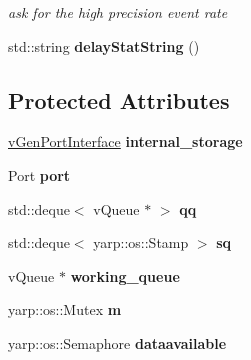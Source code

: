 \begin{DoxyCompactItemize}
\begin{DoxyCompactList}\small\item\em ask for the high precision event rate \end{DoxyCompactList}\item 
std\+::string {\bfseries delay\+Stat\+String} ()\hypertarget{classev_1_1vGenReadPort_a1e5ad389db86c5d6c5807f23ffbd6d7b}{}\label{classev_1_1vGenReadPort_a1e5ad389db86c5d6c5807f23ffbd6d7b}

\end{DoxyCompactItemize}
\subsection*{Protected Attributes}
\begin{DoxyCompactItemize}
\item 
\hyperlink{classev_1_1vGenPortInterface}{v\+Gen\+Port\+Interface} {\bfseries internal\+\_\+storage}\hypertarget{classev_1_1vGenReadPort_a3e4f0b832acb02b24f6886ea3b10a1d3}{}\label{classev_1_1vGenReadPort_a3e4f0b832acb02b24f6886ea3b10a1d3}

\item 
Port {\bfseries port}\hypertarget{classev_1_1vGenReadPort_a2aeb0d42205bba5fd0fd9ffe83249386}{}\label{classev_1_1vGenReadPort_a2aeb0d42205bba5fd0fd9ffe83249386}

\item 
std\+::deque$<$ v\+Queue $\ast$ $>$ {\bfseries qq}\hypertarget{classev_1_1vGenReadPort_a204915401b6a23f53ad0cb94b6df0509}{}\label{classev_1_1vGenReadPort_a204915401b6a23f53ad0cb94b6df0509}

\item 
std\+::deque$<$ yarp\+::os\+::\+Stamp $>$ {\bfseries sq}\hypertarget{classev_1_1vGenReadPort_ab0ad4e5e63bf6f5cdb266d4012355a89}{}\label{classev_1_1vGenReadPort_ab0ad4e5e63bf6f5cdb266d4012355a89}

\item 
v\+Queue $\ast$ {\bfseries working\+\_\+queue}\hypertarget{classev_1_1vGenReadPort_a2a544b4f8c9218e74f974ea7dea05528}{}\label{classev_1_1vGenReadPort_a2a544b4f8c9218e74f974ea7dea05528}

\item 
yarp\+::os\+::\+Mutex {\bfseries m}\hypertarget{classev_1_1vGenReadPort_a2dbaf2e6b3d258157b7bcef1542521f3}{}\label{classev_1_1vGenReadPort_a2dbaf2e6b3d258157b7bcef1542521f3}

\item 
yarp\+::os\+::\+Semaphore {\bfseries dataavailable}\hypertarget{classev_1_1vGenReadPort_a8215c7200a13b75142f17d42df3f30d1}{}\label{classev_1_1vGenReadPort_a8215c7200a13b75142f17d42df3f30d1}


\end{DoxyCompactItemize}
